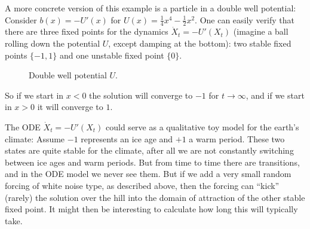 \documentclass{article}
\newcommand{\1}{\1}
\begin{document}
\begin{example*}
  A more concrete version of this example is a particle in a double well
  potential: Consider $b (x) = - U' (x)$ for $U (x) = \frac{1}{4} x^4 -
  \frac{1}{2} x^2$. One can easily verify that there are three fixed points
  for the dynamics $\dot{X}_t = - U' (X_t)$ (imagine a ball rolling down the
  potential $U$, except damping at the bottom): two stable fixed points $\{-
  1, 1\}$ and one unstable fixed point $\{0\}$.
  
  \begin{figure}[h]
    \caption{Double well potential $U$.}
  \end{figure}
  
  So if we start in $x < 0$ the solution will converge to $- 1$ for $t
  \rightarrow \infty$, and if we start in $x > 0$ it will converge to $1$.
  
  The ODE $\dot{X}_t = - U' (X_t)$ could serve as a qualitative toy model for
  the earth's climate: Assume $- 1$ represents an ice age and $+ 1$ a warm
  period. These two states are quite stable for the climate, after all we are
  not constantly switching between ice ages and warm periods. But from time to
  time there are transitions, and in the ODE model we never see them. But if
  we add a very small random forcing of white noise type, as described above,
  then the forcing can ``kick'' (rarely) the solution over the hill into the
  domain of attraction of the other stable fixed point. It might then be
  interesting to calculate how long this will typically take.
\end{example*}
\end{document}
